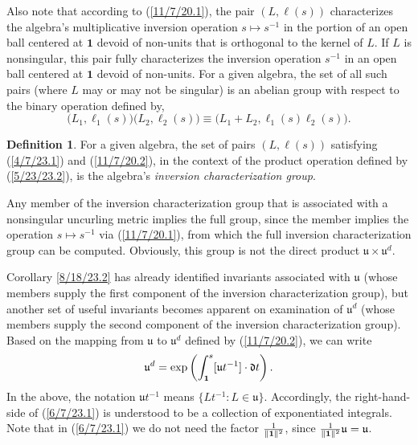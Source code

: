 \documentclass{amsart}
\numberwithin{equation}{section}
\theoremstyle{definition}
\newtheorem{definition}[theorem]{Definition}
\numberwithin{theorem}{section}
\begin{document}
    
Also note that according to (\ref{11/7/20.1}), the pair $(L, \ell(s))$ characterizes the algebra's multiplicative inversion operation $s\mapsto s^{-1}$ in the portion of an open ball centered at $\mathbf{1}$ devoid of non-units that is orthogonal to the kernel of $L$.  If $L$ is nonsingular, this pair fully characterizes the inversion operation $s^{-1}$ in an open ball centered at $\mathbf{1}$ devoid of non-units.  For a given algebra, the set of all such pairs (where $L$ may or may not be singular) is an abelian group with respect to the binary operation defined by,
\begin{equation}\label{5/23/23.2} \big(L_1, \ell_1(s)\big)\big(L_2, \ell_2(s)\big) \equiv 
\big(L_1+L_2, \ell_1(s)  \ell_2(s)\big).\end{equation} 
\begin{definition} For a given algebra, the set of pairs $(L, \ell(s))$ satisfying (\ref{4/7/23.1}) and (\ref{11/7/20.2}), in the context of the product operation defined by (\ref{5/23/23.2}), is the algebra's {\it inversion characterization group}. \end{definition}

Any member of the inversion characterization group that is associated with a nonsingular uncurling metric implies the full group, since the member implies the operation $s\mapsto s^{-1}$ via (\ref{11/7/20.1}), from which the full inversion characterization group can be computed.  Obviously, this group is not the direct product $\mathfrak{u}\times\mathfrak{u}^d$. 

Corollary \ref{8/18/23.2} has already identified invariants associated with $\mathfrak{u}$ (whose members supply the first component of the inversion characterization group), but another set of useful invariants becomes apparent on examination of $\mathfrak{u}^d$ (whose members supply the second component of the inversion characterization group).  Based on the mapping from $\mathfrak{u}$ to $\mathfrak{u}^d$ defined by (\ref{11/7/20.2}),  we can write \begin{equation}  \mathfrak{u}^d = \exp\left(\int_{\bf 1}^s [\mathfrak{u}t^{-1}]\cdot \mathfrak{d}t\right). \label{6/7/23.1}\end{equation}  In the above, the notation $\mathfrak{u}t^{-1}$ means $\{Lt^{-1}: L\in \mathfrak{u}\}$.  Accordingly, the right-hand-side of (\ref{6/7/23.1}) is understood to be a collection of exponentiated integrals.   Note that in (\ref{6/7/23.1}) we do not need the factor $\frac{1}{\|{\bf 1}\|^2}$, since $\frac{1}{\|{\bf 1}\|^2}\mathfrak{u}=\mathfrak{u}$.  
\end{document}
